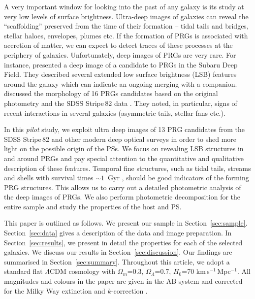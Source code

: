 \documentclass{raa}
\begin{document}
A very important window for looking into the past of any galaxy is its 
study at very low levels of surface brightness. Ultra-deep images of galaxies 
can reveal the ``scaffolding'' preserved from the time of their formation --
tidal tails and bridges, stellar haloes, envelopes, plumes etc.
If the formation of PRGs is associated with accretion of matter, 
we can expect to detect traces of these processes at the periphery of galaxies.
Unfortunately, deep images of PRGs are very rare. For instance, \cite{fink2010} 
presented a deep image of a candidate to PRGs in the Subaru Deep 
Field. They described several extended low surface brightness (LSB) features
around the galaxy which can indicate an ongoing merging with a companion.
\cite{fink2012} discussed the morphology of 16 PRGs candidates based on
the original photometry and the SDSS Stripe\,82 data \citep{jiang2008}.
They noted, in particular, signs of recent interactions in several 
galaxies (asymmetric tails, stellar fans etc.). 

In this \textit{pilot} study, we exploit ultra deep images of 13 PRG candidates from
 the SDSS Stripe\,82 and other modern deep optical surveys in order to shed more light on the possible origin 
of the PSs. We focus on revealing LSB structures in and around PRGs and pay special attention to the quantitative and qualitative description of these features. Temporal fine structures, such as tidal tails, streams and shells with survival times $\sim1$~Gyr \citep[see e.g.][and references therein]{2019A&A...632A.122M,2020A&A...640A..38R}, should be good indicators of the forming PRG structures. This allows us to carry out a detailed photometric analysis of the deep images of PRGs. We also perform photometric decomposition for the entire sample and study the properties of the host and PS. 

This paper is outlined as follows. We present our sample in Section~\ref{sec:sample}. Section~\ref{sec:data} gives a description of the data and image preparation. In Section~\ref{sec:results}, we present in detail the properties for each of the selected galaxies. We discuss our results in Section~\ref{sec:discussion}. Our findings are summarised in Section~\ref{sec:summary}. Throughout this article, we adopt a standard 
flat $\Lambda$CDM
cosmology with $\Omega_m$=0.3, $\Omega_{\Lambda}$=0.7, 
$H_0$=70 km\,s$^{-1}$\,Mpc$^{-1}$. All magnitudes and colours in the paper are given
in the AB-system and corrected for the Milky Way extinction \citep{schfin2011} and $k$-correction \citep{chil2010}.
\end{document}

